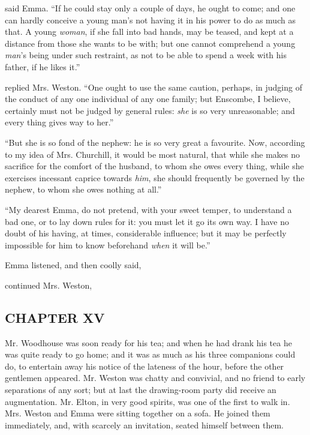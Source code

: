  said Emma. “If he could stay only a couple of days, he ought to come; and one can hardly conceive a young man's not having it in his power to do as much as that. A young {\em woman}, if she fall into bad hands, may be teased, and kept at a distance from those she wants to be with; but one cannot comprehend a young {\em man}'s being under such restraint, as not to be able to spend a week with his father, if he likes it.”

 replied Mrs. Weston. “One ought to use the same caution, perhaps, in judging of the conduct of any one individual of any one family; but Enscombe, I believe, certainly must not be judged by general rules: {\em she} is so very unreasonable; and every thing gives way to her.”

“But she is so fond of the nephew: he is so very great a favourite. Now, according to my idea of Mrs. Churchill, it would be most natural, that while she makes no sacrifice for the comfort of the husband, to whom she owes every thing, while she exercises incessant caprice towards {\em him}, she should frequently be governed by the nephew, to whom she owes nothing at all.”

“My dearest Emma, do not pretend, with your sweet temper, to understand a bad one, or to lay down rules for it: you must let it go its own way. I have no doubt of his having, at times, considerable influence; but it may be perfectly impossible for him to know beforehand {\em when} it will be.”

Emma listened, and then coolly said, 

 continued Mrs. Weston, 

\subsection[chapter-xv]{\useURL[url15][][][]\from[url15]CHAPTER XV}

Mr. Woodhouse was soon ready for his tea; and when he had drank his tea he was quite ready to go home; and it was as much as his three companions could do, to entertain away his notice of the lateness of the hour, before the other gentlemen appeared. Mr. Weston was chatty and convivial, and no friend to early separations of any sort; but at last the drawing-room party did receive an augmentation. Mr. Elton, in very good spirits, was one of the first to walk in. Mrs. Weston and Emma were sitting together on a sofa. He joined them immediately, and, with scarcely an invitation, seated himself between them.

